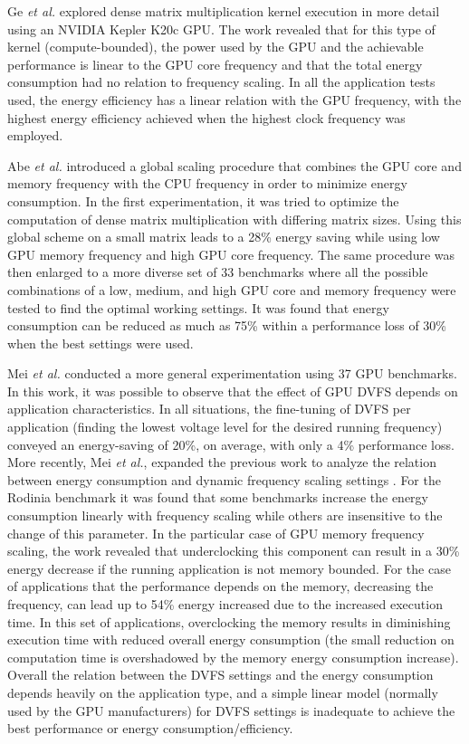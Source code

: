 Ge \textit{et al.} \cite{ge_effects_2013} explored dense matrix multiplication kernel execution in more detail using an NVIDIA Kepler K20c GPU.  The work revealed that for this type of kernel (compute-bounded), the power used by the GPU and the achievable performance is linear to the GPU core frequency and that the total energy consumption had no relation to frequency scaling. In all the application tests used, the energy efficiency has a linear relation with the GPU frequency, with the highest energy efficiency achieved when the highest clock frequency was employed.

Abe \textit{et al.} \cite{abe_power_2012} introduced a global scaling procedure that combines the GPU core and memory frequency with the CPU frequency in order to minimize energy consumption. In the first experimentation, it was tried to optimize the computation of dense matrix multiplication with differing matrix sizes. Using this global scheme on a small matrix leads to a 28\% energy saving while using low GPU memory frequency and high GPU core frequency. The same procedure was then enlarged to a more diverse set of 33 benchmarks where all the possible combinations of a low, medium, and high GPU core and memory frequency were tested to find the optimal working settings. It was found that energy consumption can be reduced as much as 75\% within a performance loss of 30\% when the best settings were used. 

Mei \textit{et al.} \cite{mei_measurement_2013} conducted a more general experimentation using 37 GPU benchmarks. In this work, it was possible to observe that the effect of GPU DVFS depends on application characteristics. In all situations, the fine-tuning of DVFS per application (finding the lowest voltage level for the desired running frequency) conveyed an energy-saving of 20\%, on average, with only a 4\% performance loss. More recently, Mei  \textit{et al.}, expanded the previous work to analyze the relation between energy consumption and dynamic frequency scaling settings \cite{mei_survey_2016}. For the  Rodinia benchmark \cite{che_rodinia:_2009} it was found that some benchmarks increase the energy consumption linearly with frequency scaling while others are insensitive to the change of this parameter. In the particular case of GPU memory frequency scaling, the work revealed that underclocking this component can result in a 30\% energy decrease if the running application is not memory bounded. For the case of applications that the performance depends on the memory, decreasing the frequency, can lead up to 54\% energy increased due to the increased execution time. In this set of applications, overclocking the memory results in diminishing execution time with reduced overall energy consumption (the small reduction on computation time is overshadowed by the memory energy consumption increase). Overall the relation between the DVFS settings and the energy consumption depends heavily on the application type, and a simple linear model (normally used by the GPU manufacturers) for DVFS settings is inadequate to achieve the best performance or energy consumption/efficiency.


